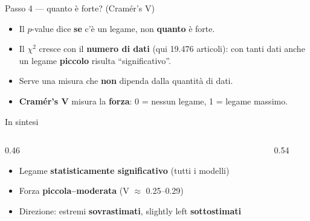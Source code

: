 \documentclass[aspectratio=169]{beamer}
\newcommand{\hl}[1]{\textbf{#1}}
\begin{document}
\begin{frame}{Passo 4 --- quanto \`e forte? (Cram\'er's V)}
  \vfill
  \begin{itemize}[<+->]
    \setlength\itemsep{0.9em}
    \item Il $p$-value dice \hl{se} c'\`e un legame, non \hl{quanto} \`e forte.
    \item Il $\chi^2$ cresce con il \hl{numero di dati} (qui 19.476 articoli): con tanti dati anche un legame \hl{piccolo} risulta ``significativo''.
    \item Serve una misura che \hl{non} dipenda dalla quantit\`a di dati.
    \item \hl{Cram\'er's V} misura la \hl{forza}: 0 = nessun legame, 1 = legame massimo.
  \end{itemize}
  \vfill
\end{frame}

\begin{frame}{In sintesi}
  \begin{columns}[c]
    \begin{column}{0.46\textwidth}
      \begin{itemize}[<+->]
        \setlength\itemsep{0.9em}
        \item Legame \hl{statisticamente significativo} (tutti i modelli)
        \item Forza \hl{piccola--moderata} (V $\approx$ 0.25--0.29)
        \item Direzione: estremi \hl{sovrastimati}, slightly left \hl{sottostimati}
      \end{itemize}
    \end{column}
    \begin{column}{0.54\textwidth}
    \end{column}
  \end{columns}
\end{frame}
\end{document}
